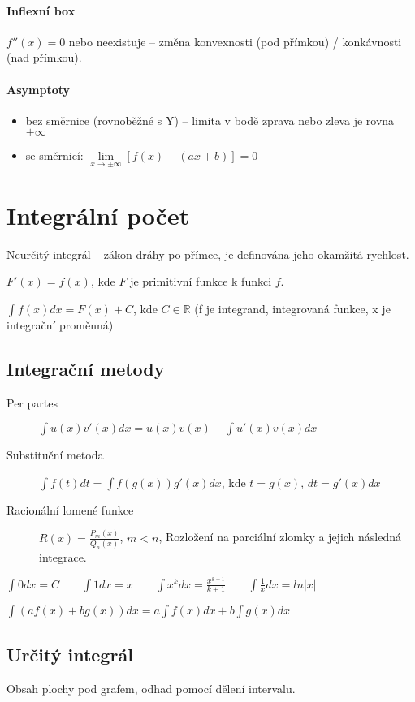 \documentclass[a4paper, 11pt]{report}
\begin{document}
\paragraph{Inflexní box} $f''(x) = 0$ nebo neexistuje -- změna konvexnosti (pod přímkou) / konkávnosti (nad přímkou).

\paragraph{Asymptoty}
\begin{itemize}
	\item bez směrnice (rovnoběžné s Y) -- limita v bodě zprava nebo zleva je rovna $\pm \infty$
	\item se směrnicí: $\lim\limits_{x \to \pm \infty} \left[ f(x) - (ax + b) \right] = 0$
\end{itemize}

\section{Integrální počet}

Neurčitý integrál -- zákon dráhy po přímce, je definována jeho okamžitá rychlost.

$F'(x) = f(x)$, kde $F$ je primitivní funkce k funkci $f$.

$\int f(x) dx = F(x) + C$, kde $C \in \mathbb{R}$ (f je integrand, integrovaná funkce, x je integrační proměnná)

\subsection{Integrační metody}
\begin{description}
	\item[Per partes] $\int u(x) v'(x) dx = u(x) v(x) - \int u'(x) v(x) dx$
	\item[Substituční metoda] $\int f(t) dt = \int f( g(x) ) g'(x) dx$, kde $t = g(x)$, $dt = g'(x)dx$
	\item[Racionální lomené funkce] $R(x) = \frac{P_m(x)}{Q_n(x)}$, $m < n$, Rozložení na parciální zlomky a jejich následná integrace.
\end{description}

$\int 0 dx = C \qquad
\int 1 dx = x \qquad
\int x^k dx = \frac{x^{k+1}}{k+1} \qquad
\int \frac{1}{x} dx = ln |x|$

$\int\left(a f \left(x \right) + b g \left(x \right) \right) dx = a \int f(x) dx + b \int g(x) dx$

\subsection{Určitý integrál} Obsah plochy pod grafem, odhad pomocí dělení intervalu.
\end{document}
